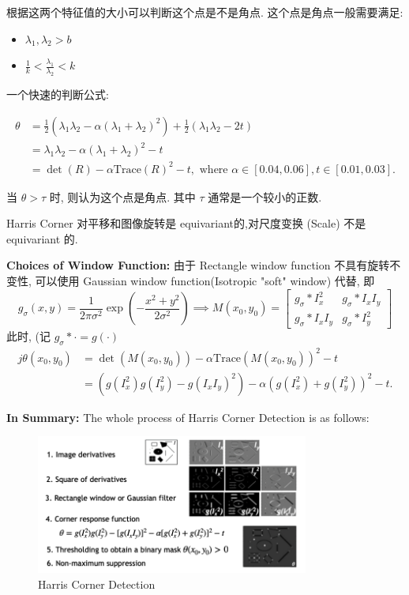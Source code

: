 根据这两个特征值的大小可以判断这个点是不是角点. 这个点是角点一般需要满足:

\begin{itemize}
    \item $\lambda_1, \lambda_2>b$
    \item $\frac{1}{k}<\frac{\lambda_1}{\lambda_2}<k$
\end{itemize}

一个快速的判断公式:

\begin{equation}
\begin{aligned}
\theta&=\frac 12(\lambda_1\lambda_2-\alpha(\lambda_1+\lambda_2)^2)+\frac12(\lambda_1\lambda_2-2t)\\
&=\lambda_1\lambda_2-\alpha(\lambda_1+\lambda_2)^2-t\\
&=\det(R)-\alpha\text{Trace}(R)^2-t, \text{ where } \alpha\in[0.04,0.06], t\in[0.01,0.03].
\end{aligned}
\end{equation}

当 $\theta > \tau$ 时, 则认为这个点是角点. 其中 $\tau$ 通常是一个较小的正数.


Harris Corner 对平移和图像旋转是 equivariant的,对尺度变换 (Scale) 不是 equivariant 的.

\textbf{Choices of Window Function:} 由于 Rectangle window function 不具有旋转不变性, 可以使用 Gaussian window function(Isotropic "soft" window) 代替, 即
\[
    g_\sigma(x,y)=\frac{1}{2\pi\sigma^2}\exp\left( -\frac{x^2+y^2}{2\sigma^2} \right) \implies M(x_0, y_0) = \begin{bmatrix}
        g_\sigma \ast I_x^2 & g_\sigma \ast I_xI_y \\ g_\sigma \ast I_xI_y & g_\sigma \ast I_y^2 
    \end{bmatrix}
\]
此时, (记 $g_\sigma \ast \cdot = g(\cdot)$
\begin{align*}j
    \theta(x_0, y_0) &= \det(M(x_0, y_0)) - \alpha \text{Trace}(M(x_0, y_0))^2 - t \\
    &= \left(g(I_x^2) g(I_y^2) - g(I_xI_y)^2\right) - \alpha \left(g(I_x^2) + g(I_y^2)\right)^2 - t.
\end{align*}

\textbf{In Summary:} The whole process of Harris Corner Detection is as follows:
\begin{figure}[htbp]
    \centering
    \includegraphics[width=0.8\textwidth]{figures/Harris_process.png}
    \caption{Harris Corner Detection}
\end{figure}
